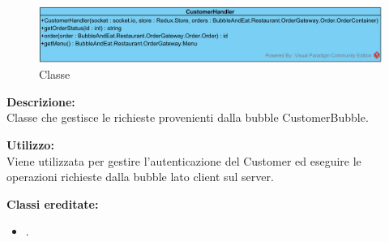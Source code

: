 \subparagraph[::CustomerHandler]{\class}\mbox{}\\ \label{\class}
\begin{figure}[H]
	\centering
		\includegraphics[width=15cm]{./diagrammi/demo/server/handlers/customerhandler.png}
	\caption{Classe \class}
\end{figure}
\textbf{Descrizione:}\\
Classe che gestisce le richieste provenienti dalla bubble CustomerBubble.

\textbf{Utilizzo:}\\
Viene utilizzata per gestire l'autenticazione del Customer ed eseguire le operazioni richieste dalla bubble lato client sul server.

\textbf{Classi ereditate:}
\begin{itemize}
	\item {}.
\end{itemize}
%


